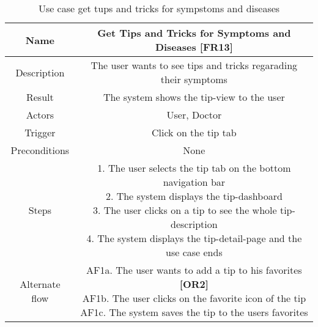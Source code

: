 \begin{table}[H]
	\begin{center}\scriptsize
		\def\arraystretch{2}%
		\begin{tabular}{ |c|c| } 
			\hline
			Name & Get Tips and Tricks for Symptoms and Diseases \textbf{[FR13]}\\
			\hline	
			Description & The user wants to see tips and tricks regarading their symptoms \\ 
			\hline
			Result & The system shows the tip-view to the user\\ 
			\hline
			Actors & User, Doctor \\ 
			\hline
			Trigger & Click on the tip tab\\ 
			\hline
			Preconditions & None \\ 
			\hline
			Steps & \parbox{9cm}{\vspace{.5\baselineskip}
				1. The user selects the tip tab on the bottom navigation bar\\
				2. The system displays the tip-dashboard\\
				3. The user clicks on a tip to see the whole tip-description\\
				4. The system displays the tip-detail-page and the use case ends}\\
			\hline
			Alternate flow & \parbox{9cm}{\vspace{.5\baselineskip} 
				AF1a. The user wants to add a tip to his favorites \textbf{[OR2]}\\
				AF1b. The user clicks on the favorite icon of the tip\\
				AF1c. The system saves the tip to the users favorites }\\
			\hline
		\end{tabular}\normalsize
	\end{center}
	\caption{Use case get tups and tricks for sympstoms and diseases}
\end{table}
